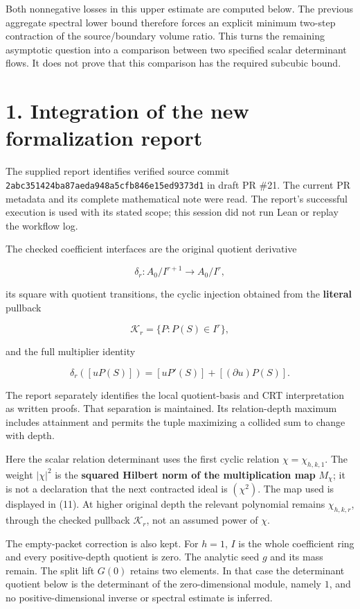 \documentclass[
  11pt,
]{article}
\begin{document}
Both nonnegative losses in this upper estimate are computed below. The
previous aggregate spectral lower bound therefore forces an explicit
minimum two-step contraction of the source/boundary volume ratio. This
turns the remaining asymptotic question into a comparison between two
specified scalar determinant flows. It does not prove that this
comparison has the required subcubic bound.

\section{1. Integration of the new formalization
report}\label{integration-of-the-new-formalization-report}

The supplied report identifies verified source commit
\texttt{2abc351424ba87aeda948a5cfb846e15ed9373d1} in draft PR \#21. The
current PR metadata and its complete mathematical note were read. The
report's successful execution is used with its stated scope; this
session did not run Lean or replay the workflow log.

The checked coefficient interfaces are the original quotient derivative

\[
\delta_r:A_0/I^{r+1}\longrightarrow A_0/I^r,
\]

its square with quotient transitions, the cyclic injection obtained from
the \textbf{literal} pullback

\[
\mathcal K_r=\{P:P(S)\in I^r\},
\]

and the full multiplier identity

\[
\delta_r([uP(S)])=[uP'(S)]+[(\partial u)P(S)].
\]

The report separately identifies the local quotient-basis and CRT
interpretation as written proofs. That separation is maintained. Its
relation-depth maximum includes attainment and permits the tuple
maximizing a collided sum to change with depth.

Here the scalar relation determinant uses the first cyclic relation
\(\chi=\chi_{h,k,1}\). The weight \(|\chi|^2\) is the \textbf{squared
Hilbert norm of the multiplication map} \(M_\chi\); it is not a
declaration that the next contracted ideal is \((\chi^2)\). The map used
is displayed in (11). At higher original depth the relevant polynomial
remains \(\chi_{h,k,r}\), through the checked pullback \(\mathcal K_r\),
not an assumed power of \(\chi\).

The empty-packet correction is also kept. For \(h=1\), \(I\) is the
whole coefficient ring and every positive-depth quotient is zero. The
analytic seed \(g\) and its mass remain. The split lift \(G(0)\) retains
two elements. In that case the determinant quotient below is the
determinant of the zero-dimensional module, namely \(1\), and no
positive-dimensional inverse or spectral estimate is inferred.
\end{document}
